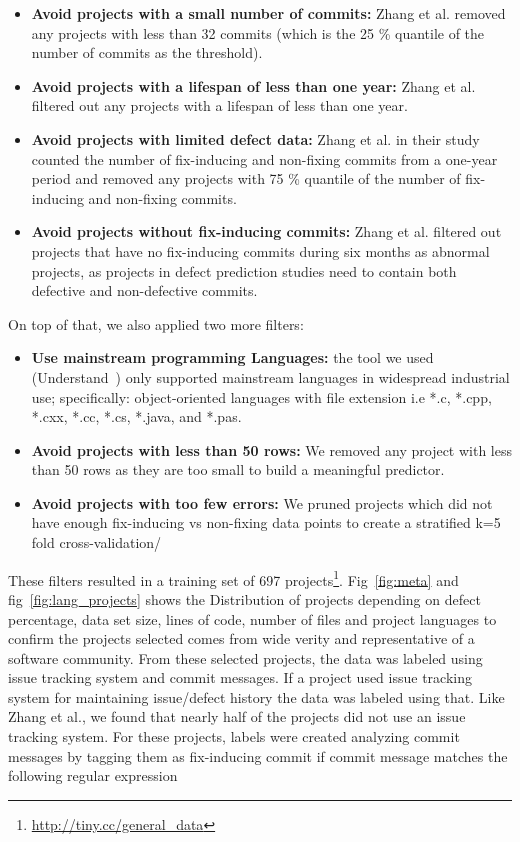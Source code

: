 \documentclass[10pt,journal,compsoc]{IEEEtran}
\newcommand{\bi}{\begin{itemize}}
\newcommand{\ei}{\end{itemize}}
\begin{document}
\bi
  \item \textbf{Avoid projects with a small number of commits:} Zhang et al. removed any projects with less than 32 commits (which is the 25 \% quantile of the number of commits as the threshold). 
 
    
    \item \textbf{Avoid projects with a lifespan of less than one year:} Zhang et al. filtered out any  projects with a lifespan of less than one year.  
    
    \item \textbf{Avoid projects with limited defect data:} Zhang et al. in their study counted the number of fix-inducing and non-fixing commits from a one-year period and removed any projects with 75 \% quantile of the number of fix-inducing and non-fixing commits.  
    
    \item \textbf{Avoid projects without fix-inducing commits:} Zhang et al. filtered out projects that have no fix-inducing commits during six months as abnormal projects, as projects in defect prediction studies need to contain both defective and non-defective commits.
\ei
On top of that, we also applied two more filters:
\bi
    \item \textbf{Use mainstream programming Languages:} the tool
    we used (Understand~\cite{visualize}) only supported     mainstream languages in widespread
    industrial use; specifically: object-oriented languages with file extension i.e *.c, *.cpp, *.cxx, *.cc, *.cs, *.java, and *.pas.
    
    \item \textbf{Avoid projects with less than 50 rows:} We removed any project with less than 50 rows as they are too small to build a meaningful predictor. 
       \item \textbf{Avoid projects with too few errors:}
    We pruned  projects which did not  have enough fix-inducing vs non-fixing data points to create a stratified k=5 fold cross-validation/%
    
\ei
These filters resulted in a training set of   697 projects\footnote{\href{http://tiny.cc/general\_data}{http://tiny.cc/general\_data}}. Fig~\ref{fig:meta} and fig~\ref{fig:lang_projects} shows the Distribution of projects depending on defect percentage, data set size, lines of code, number of files and project languages to confirm the projects selected comes from wide verity and representative of a software community. 
From these selected projects, the data was labeled using issue tracking system and commit messages. If a project used issue tracking system for maintaining issue/defect history the data was labeled using that. Like  Zhang et al., we found that nearly half  of the projects did not use an issue tracking system. For these projects, labels were created analyzing commit messages by tagging them as fix-inducing commit if commit message matches the following regular expression
\end{document}
